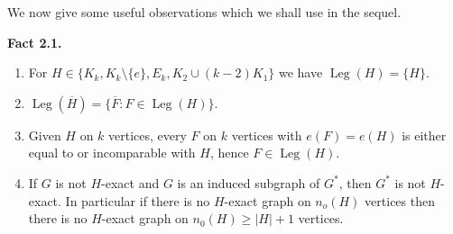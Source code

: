 \documentclass[a4paper,12pt]{article}
\newcommand{\Leg}{\operatorname{Leg}}%
\begin{document}
\bigskip

We now give some useful observations which we shall use in the sequel.

\bigskip

\noindent
\textbf{Fact 2.1.}

\begin{enumerate}

\item
For $H \in \{ K_k , K_k \setminus \{e\} , E_k , K_2 \cup (k-2)K_1 \}$ we have $\Leg(H) = \{H\}$.

\item
$\Leg(\overline{H}) = \{ \overline{F} : F \in \Leg(H) \}$.

\item
Given $H$ on $k$ vertices, every $F$ on $k$ vertices with $e(F) = e(H)$ is either equal to  or incomparable with $H$, hence $F \in \Leg(H)$.

\item
If $G$ is not $H$-exact and $G$ is an induced subgraph of $G^*$, then $G^*$ is not $H$-exact. In particular if there is no $H$-exact graph on $n_o(H)$ vertices then there is no $H$-exact graph on $n_0(H) \geq |H|+1$ vertices.


\end{enumerate}
\end{document}
